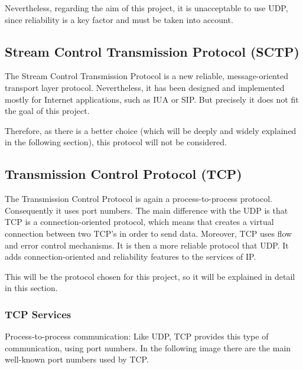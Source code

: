 Nevertheless, regarding the aim of this project, it is unacceptable to use UDP, since reliability is a key factor and must be taken into account.

\subsection{Stream Control Transmission Protocol (SCTP)}
The Stream Control Transmission Protocol is a new reliable, message-oriented transport layer protocol. Nevertheless, it has been designed and implemented mostly for Internet applications, such as IUA or SIP. But precisely it does not fit the goal of this project. 

Therefore, as there is a better choice (which will be deeply and widely explained in the following section), this protocol will not be considered. 

\subsection{ Transmission Control Protocol (TCP)}
The Transmission Control Protocol is again a process-to-process protocol. Consequently it uses port numbers. The main difference with the UDP is that TCP is a connection-oriented protocol, which means that creates a virtual connection between two TCP's in order to send data. Moreover, TCP uses flow and error control mechanisms. It is then a more reliable protocol that UDP. It adds connection-oriented and reliability features to the services of IP.

This will be the protocol chosen for this project, so it will be explained in detail in this section. 

\subsubsection{TCP Services}
Process-to-process communication: Like UDP, TCP provides this type of communication, using port numbers. In the following image there are the main well-known port numbers used by TCP.

